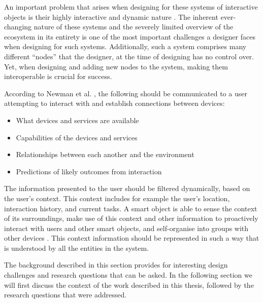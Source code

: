An important problem that arises when designing for these systems of interactive objects is their highly interactive and dynamic nature \cite{Frens2009}. The inherent ever-changing nature of these systems and the severely limited overview of the ecosystem in its entirety is one of the most important challenges a designer faces when designing for such systems. Additionally, such a system comprises many different ``nodes'' that the designer, at the time of designing has no control over. Yet, when designing and adding new nodes to the system, making them interoperable is crucial for success. 

According to Newman et al. \cite{Newman2002}, the following should be communicated to a user attempting to interact with and establish connections between devices:
\begin{itemize}
\item What devices and services are available
\item Capabilities of the devices and services
\item Relationships between each another and the environment
\item Predictions of likely outcomes from interaction
\end{itemize}

The information presented to the user should be filtered dynamically, based on the user's context. This context includes for example the user's location, interaction history, and current tasks. A smart object is able to sense the context of its surroundings, make use of this context and other information to proactively interact with users and other smart objects, and self-organise into groups with other devices \cite{Sabou2010}. This context information should be represented in such a way that is understood by all the entities in the system. 


The background described in this section provides for interesting design challenges and research questions that can be asked. In the following section we will first discuss the context of the work described in this thesis, followed by the research questions that were addressed.







